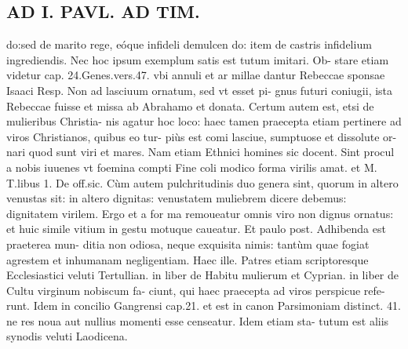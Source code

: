 \documentclass{article}
\begin{document}
\begin{pages}
\section*{AD I. PAVL. AD TIM. }
\marginpar{[ p.78 ]}\pstart do:sed de marito rege, eóque infideli demulcen do: item de castris infidelium ingrediendis. Nec hoc ipsum exemplum satis est tutum imitari. Ob- stare etiam videtur cap. 24.Genes.vers.47. vbi annuli et ar millae dantur Rebeccae sponsae Isaaci Resp. Non ad lasciuum ornatum, sed vt esset pi- gnus futuri coniugii, ista Rebeccae fuisse et missa ab Abrahamo et donata.  \pend\pstart Certum autem est, etsi de mulieribus Christia- nis agatur hoc loco: haec tamen praecepta etiam pertinere ad viros Christianos, quibus eo tur- piùs est comi lasciue, sumptuose et dissolute or- nari quod sunt viri et mares. Nam etiam Ethnici homines sic docent.  \pend\pstart Sint procul a nobis iuuenes vt foemina compti Fine coli modico forma virilis amat. et M. T.libus 1. De off.sic. Cùm autem pulchritudinis duo genera sint, quorum in altero venustas sit: in altero dignitas: venustatem muliebrem dicere debemus: dignitatem virilem. Ergo et a for ma remoueatur omnis viro non dignus ornatus: et huic simile vitium in gestu motuque caueatur.  \pend\pstart Et paulo post. Adhibenda est praeterea mun- ditia non odiosa, neque exquisita nimis: tantùm quae fogiat agrestem et inhumanam negligentiam. Haec ille. Patres etiam scriptoresque Ecclesiastici veluti Tertullian. in liber  de Habitu mulierum et Cyprian. in liber  de Cultu virginum nobiscum fa- ciunt, qui haec praecepta ad viros perspicue refe- runt. Idem in concilio Gangrensi cap.21. et est in canon Parsimoniam distinct. 41. ne res noua aut nullius momenti esse censeatur. Idem etiam sta- tutum est aliis synodis veluti Laodicena.  \pend

\end{pages}
\end{document}
